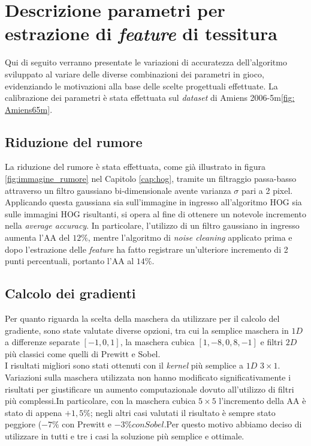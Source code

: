 %

\section{Descrizione parametri per estrazione di \emph{feature} di tessitura}
Qui di seguito verranno presentate le variazioni di accuratezza dell'algoritmo sviluppato al variare delle diverse combinazioni dei parametri in gioco, evidenziando le motivazioni alla base delle scelte progettuali effettuate. La calibrazione dei parametri è stata effettuata sul \emph{dataset} di Amiens 2006-5m\ref{fig: Amiens65m}. 

\subsection{Riduzione del rumore}
La riduzione del rumore è stata effettuata, come già illustrato in figura \ref{fig:immagine_rumore} nel Capitolo \ref{cap:hog}, tramite un filtraggio passa-basso attraverso un filtro gaussiano bi-dimensionale avente varianza $\sigma$ pari a 2 pixel. Applicando questa gaussiana sia sull'immagine in ingresso all'algoritmo HOG sia sulle immagini HOG risultanti, si opera al fine di ottenere un notevole incremento nella \emph{average accuracy}. In particolare, l'utilizzo di un filtro gaussiano in ingresso aumenta l'AA del $12\%$, mentre l'algoritmo di \emph{noise cleaning} applicato prima e dopo l'estrazione delle \emph{feature} ha fatto registrare un'ulteriore incremento di 2 punti percentuali, portanto l'AA al $14\%$.

\subsection{Calcolo dei gradienti}
Per quanto riguarda la scelta della maschera da utilizzare per il calcolo del gradiente, sono state valutate diverse opzioni, tra cui la semplice maschera in $1D$ a differenze separate $[-1, 0 ,1]$, la maschera cubica $[1,-8,0,8,-1]$ e filtri  $2D$ più classici come quelli di Prewitt e Sobel.\\
I risultati migliori sono stati ottenuti con il \emph{kernel} più semplice a $1D$ $3\times1$. Variazioni sulla maschera utilizzata non hanno modificato significativamente i risultati per giustificare un aumento computazionale dovuto all'utilizzo di filtri più complessi.In particolare, con la maschera cubica $5\times5$ l'incremento della AA è stato di appena $+1,5\%$; negli altri casi valutati il risultato è sempre stato peggiore ($-7\%$ con Prewitt e $-3\%con Sobel$.Per questo motivo abbiamo deciso di utilizzare in tutti e tre i casi la soluzione più semplice e ottimale.\\

